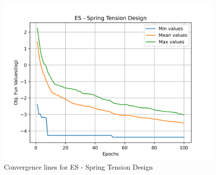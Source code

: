 \begin{figure}[H]
        \centering
        \caption{Convergence lines for ES - Spring Tension Design}
        \label{fig:spring_problem_solve_es}
        \includegraphics[scale=0.5]{images/spring_problem_solve_es.png}
        \end{figure}
        